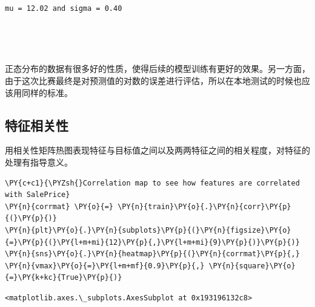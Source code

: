 \documentclass[no-math]{YangThesis}
\begin{document}
\begin{Verbatim}[commandchars=\\\{\}]

mu = 12.02 and sigma = 0.40

\end{Verbatim}

\begin{center}
\end{center}
{ \hspace*{\fill} \\}

\begin{center}
\end{center}
{ \hspace*{\fill} \\}

正态分布的数据有很多好的性质，使得后续的模型训练有更好的效果。另一方面，由于这次比赛最终是对预测值的对数的误差进行评估，所以在本地测试的时候也应该用同样的标准。

\hypertarget{ux7279ux5f81ux76f8ux5173ux6027}{%
	\subsection{特征相关性}\label{ux7279ux5f81ux76f8ux5173ux6027}}

用相关性矩阵热图表现特征与目标值之间以及两两特征之间的相关程度，对特征的处理有指导意义。

\begin{tcolorbox}[breakable, size=fbox, boxrule=1pt, pad at break*=1mm,colback=cellbackground, colframe=cellborder]
	\begin{Verbatim}[commandchars=\\\{\}]
\PY{c+c1}{\PYZsh{}Correlation map to see how features are correlated with SalePrice}
\PY{n}{corrmat} \PY{o}{=} \PY{n}{train}\PY{o}{.}\PY{n}{corr}\PY{p}{(}\PY{p}{)}
\PY{n}{plt}\PY{o}{.}\PY{n}{subplots}\PY{p}{(}\PY{n}{figsize}\PY{o}{=}\PY{p}{(}\PY{l+m+mi}{12}\PY{p}{,}\PY{l+m+mi}{9}\PY{p}{)}\PY{p}{)}
\PY{n}{sns}\PY{o}{.}\PY{n}{heatmap}\PY{p}{(}\PY{n}{corrmat}\PY{p}{,} \PY{n}{vmax}\PY{o}{=}\PY{l+m+mf}{0.9}\PY{p}{,} \PY{n}{square}\PY{o}{=}\PY{k+kc}{True}\PY{p}{)}
	\end{Verbatim}
\end{tcolorbox}

\begin{tcolorbox}[breakable, size=fbox, boxrule=.5pt, pad at break*=1mm, opacityfill=0]
	\begin{Verbatim}[commandchars=\\\{\}]
	<matplotlib.axes.\_subplots.AxesSubplot at 0x193196132c8>
	\end{Verbatim}
\end{tcolorbox}
\end{document}
